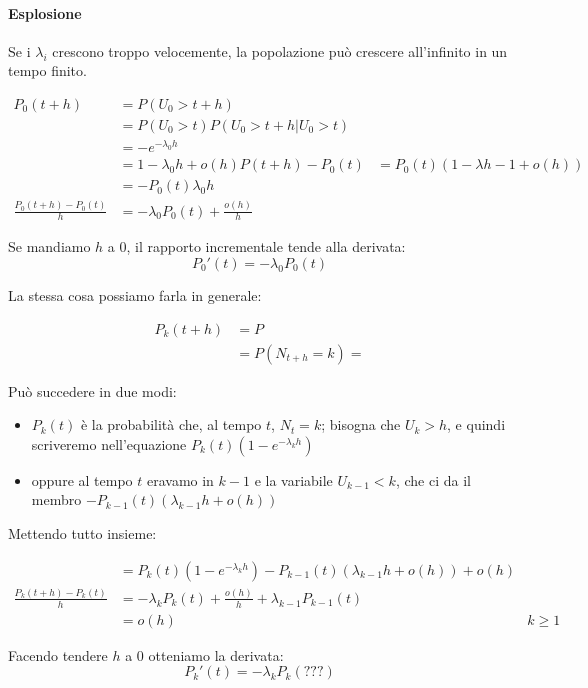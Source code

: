 \documentclass[a4paper,12pt]{book}
\begin{document}
 \paragraph{Esplosione} Se i $\lambda_{i}$ crescono troppo velocemente, la popolazione può crescere all'infinito in un tempo finito. 
 
 \begin{align*}
 	P_0(t+h) & = P(U_0 > t+h) \\
 	& = P(U_0 > t) P(U_0 > t+h | U_0 > t) \\
 	& = -e^{-\lambda_0 h} \\
 	& = 1 - \lambda_0 h + o(h)
 	P(t+h) - P_0(t) & = P_0(t)(1 - \lambda h - 1 + o(h)) \\
 	& = -P_0(t)\lambda_0 h \\
 	\frac{P_0(t+h) -P_0(t)}{h} & = -\lambda_0 P_0(t) +\frac{o(h)}{h}
 \end{align*}
 
 Se mandiamo $ h $ a 0, il rapporto incrementale tende alla derivata:
 $$ P_0'(t) = -\lambda_0 P_0(t) $$

La stessa cosa possiamo farla in generale:

\begin{align*}
	P_k(t+h) & = P \\
	& = P(N_{t+h} = k) =
\end{align*}

Può succedere in due modi:
\begin{itemize}
	\item $ P_k(t) $ è la probabilità che, al tempo $t$, $ N_t = k $; bisogna che $ U_k > h $, e quindi scriveremo nell'equazione $ P_k(t)(1 - e^{-\lambda_k h}) $
	\item oppure al tempo $ t $ eravamo in $ k-1 $ e la variabile $ U_{k-1} < k $, che ci da il membro $ - P_{k-1}(t) (\lambda_{k-1} h + o(h) ) $
\end{itemize} %

Mettendo tutto insieme:

\begin{align*}
	& = P_k(t)(1 - e^{-\lambda_k h}) - P_{k-1}(t) (\lambda_{k-1} h + o(h) ) + o(h) \\
	\frac{	P_k(t+h) - P_k (t)}{h} & = -\lambda_k P_k(t) + \frac{o(h)}{h} + \lambda_{k-1}P_{k-1}(t) \\
	& = o(h) & k \ge 1
\end{align*}

Facendo tendere $ h $ a 0 otteniamo la derivata:
$$ P_k'(t) = -\lambda_k P_k( ???) $$ %
\end{document}

